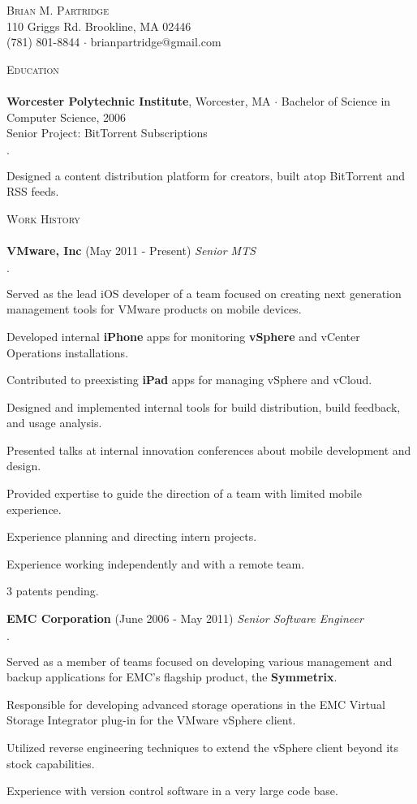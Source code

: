 \documentclass[11pt]{article}
\newcommand{\mydot}{$\cdot$ }
\newcommand{\lineunder}{\vspace*{-8pt} \\ \hspace*{-18pt} \hrulefill \\}
\newcommand{\header}[1]{{\hspace*{-15pt}\vspace*{6pt} \textsc{#1}} \vspace*{-6pt} \lineunder}
\newcommand{\contact}[3]{\vspace*{-8pt}\begin{center}{\LARGE \scshape {#1}}\\#2 \\ #3\end{center}\vspace*{-8pt}}
\newcommand{\school}[3]{\textbf{#1}{#2} \mydot #3 \\}
\newcommand{\seniorproject}[2]{Senior Project: #1\\ #2  }
\newcommand{\employer}[3]{\textbf{#1} (#2) \emph{#3}\\  }
\newenvironment{achievements}{\begin{list}{\mydot}{\topsep 0pt \itemsep -2pt}}{\vspace*{4pt}\end{list}}
\begin{document}
\small
\smallskip
\vspace*{-44pt}


\contact{Brian M. Partridge}
{110 Griggs Rd. Brookline, MA 02446}
{
(781) 801-8844
\mydot brianpartridge@gmail.com 
}


\header{Education}
\school{Worcester Polytechnic Institute}{, Worcester, MA}{Bachelor of Science in Computer Science, 2006}

\seniorproject{BitTorrent Subscriptions}{
\begin{achievements}
  \item Designed a content distribution platform for creators, built atop BitTorrent and RSS feeds.
\end{achievements}
}


\header{Work History}
\employer{VMware, Inc}{May 2011 - Present}{Senior MTS}
\begin{achievements}
  \item Served as the lead iOS developer of a team focused on creating next generation management tools for VMware products on mobile devices.
  \item Developed internal \textbf{iPhone} apps for monitoring \textbf{vSphere} and vCenter Operations installations.
  \item Contributed to preexisting \textbf{iPad} apps for managing vSphere and vCloud.
  \item Designed and implemented internal tools for build distribution, build feedback, and usage analysis.
  \item Presented talks at internal innovation conferences about mobile development and design.
  \item Provided expertise to guide the direction of a team with limited mobile experience.
  \item Experience planning and directing intern projects.
  \item Experience working independently and with a remote team.
  \item 3 patents pending.
\end{achievements}
  
\employer{EMC Corporation}{June 2006 - May 2011}{Senior Software Engineer}
\begin{achievements}
  \item Served as a member of teams focused on developing various management and backup applications for EMC's flagship product, the \textbf{Symmetrix}.
  \item Responsible for developing advanced storage operations in the EMC Virtual Storage Integrator plug-in for the VMware vSphere client.
  \item Utilized reverse engineering techniques to extend the vSphere client beyond its stock capabilities.
  \item Experience with version control software in a very large code base.
\end{achievements}
\end{document}
